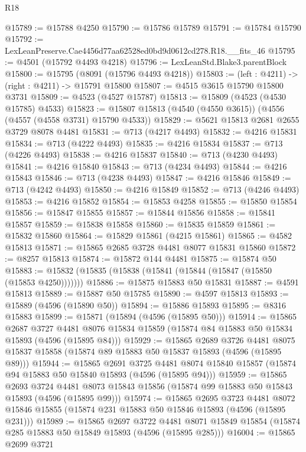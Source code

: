 \begin{lexlean}{R18}
\begin{coremodule}
@15789 := @15788 @4250
@15790 := @15786 @15789
@15791 := @15784 @15790
@15792 := LexLeanPreserve.Cae4456d77aa62528ed0bd9d0612cd278.R18.__fits_46
@15795 := @4501 (@15792 @4493 @4218)
@15796 := LexLeanStd.Blake3.parentBlock
@15800 := @15795 (@8091 (@15796 @4493 @4218))
@15803 := (left : @4211) -> (right : @4211) -> @15791 @15800
@15807 := @4515 @3615 @15790 @15800 @3731
@15809 := @4523 (@4527 @15787)
@15813 := @15809 (@4523 (@4530 @15785) @4533)
@15823 := @15807 @15813 (@4540 (@4550 @3615)) (@4556 (@4557 (@4558 @3731) @15790 @4533))
@15829 := @5621 @15813 @2681 @2655 @3729 @8078 @4481
@15831 := @713 (@4217 @4493)
@15832 := @4216 @15831
@15834 := @713 (@4222 @4493)
@15835 := @4216 @15834
@15837 := @713 (@4226 @4493)
@15838 := @4216 @15837
@15840 := @713 (@4230 @4493)
@15841 := @4216 @15840
@15843 := @713 (@4234 @4493)
@15844 := @4216 @15843
@15846 := @713 (@4238 @4493)
@15847 := @4216 @15846
@15849 := @713 (@4242 @4493)
@15850 := @4216 @15849
@15852 := @713 (@4246 @4493)
@15853 := @4216 @15852
@15854 := @15853 @4258
@15855 := @15850 @15854
@15856 := @15847 @15855
@15857 := @15844 @15856
@15858 := @15841 @15857
@15859 := @15838 @15858
@15860 := @15835 @15859
@15861 := @15832 @15860
@15864 := @15829 @15861 (@4215 @15861)
@15865 := @4582 @15813
@15871 := @15865 @2685 @3728 @4481 @8077 @15831 @15860
@15872 := @8257 @15813
@15874 := @15872 @144 @4481
@15875 := @15874 @50
@15883 := @15832 (@15835 (@15838 (@15841 (@15844 (@15847 (@15850 (@15853 @4250)))))))
@15886 := @15875 @15883 @50 @15831
@15887 := @4591 @15813
@15889 := @15887 @50 @15785
@15890 := @4597 @15813
@15893 := @15889 (@4596 (@15890 @50))
@15894 := @15886 @15893
@15895 := @8316 @15883
@15899 := @15871 (@15894 (@4596 (@15895 @50)))
@15914 := @15865
    @2687
    @3727
    @4481
    @8076
    @15834
    @15859
    (@15874 @84 @15883 @50 @15834 @15893 (@4596 (@15895 @84)))
@15929 := @15865
    @2689
    @3726
    @4481
    @8075
    @15837
    @15858
    (@15874 @89 @15883 @50 @15837 @15893 (@4596 (@15895 @89)))
@15944 := @15865
    @2691
    @3725
    @4481
    @8074
    @15840
    @15857
    (@15874 @94 @15883 @50 @15840 @15893 (@4596 (@15895 @94)))
@15959 := @15865
    @2693
    @3724
    @4481
    @8073
    @15843
    @15856
    (@15874 @99 @15883 @50 @15843 @15893 (@4596 (@15895 @99)))
@15974 := @15865
    @2695
    @3723
    @4481
    @8072
    @15846
    @15855
    (@15874 @231 @15883 @50 @15846 @15893 (@4596 (@15895 @231)))
@15989 := @15865
    @2697
    @3722
    @4481
    @8071
    @15849
    @15854
    (@15874 @285 @15883 @50 @15849 @15893 (@4596 (@15895 @285)))
@16004 := @15865
    @2699
    @3721

\end{coremodule}
\end{lexlean}
